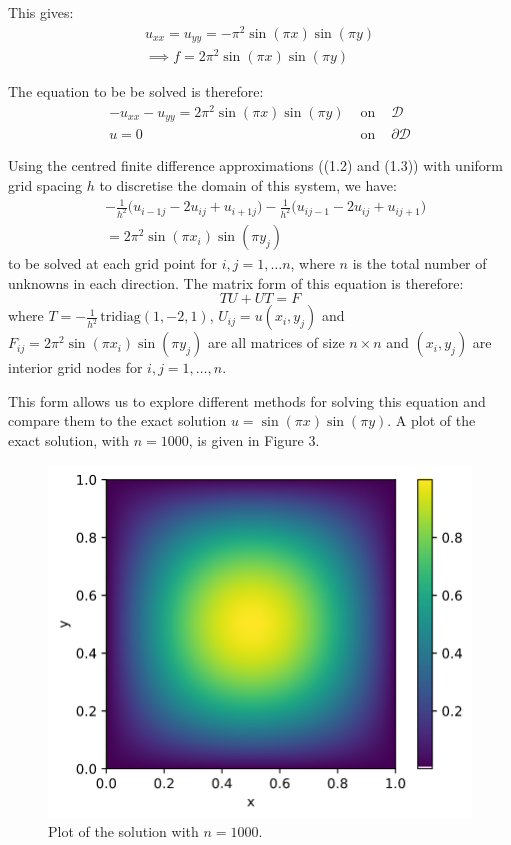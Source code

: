 \documentclass{article}
\numberwithin{equation}{section}
\begin{document}
This gives:
\begin{eqnarray} 
u_{xx} = u_{yy} = - \pi^2 \sin{(\pi x)} \sin{(\pi y)} \nonumber \\
\implies f = 2 \pi^2 \sin{(\pi x)} \sin {(\pi y)}
\end{eqnarray}

The equation to be be solved is therefore:
\begin{eqnarray}
-u_{xx} -u_{yy} = 2 \pi^2 \sin{(\pi x)} \sin {(\pi y)} & \text{ on } & \mathcal{D} \nonumber \\
u = 0 & \text{ on } & \partial \mathcal{D}
\end{eqnarray}

Using the centred finite difference approximations ((1.2) and (1.3)) with uniform grid spacing $h$ to discretise the domain of this system, we have:
	\begin{eqnarray}
	& -\frac{1}{h^2} \big( u_{i-1j} - 2u_{ij} + u_{i+1j} \big) - \frac{1}{h^2} \big( u_{ij-1} - 2u_{ij} + u_{ij+1} \big) \nonumber \\ & = 2\pi^2 \sin(\pi x_i) \sin(\pi y_j)
	\end{eqnarray}
to be solved at each grid point for $i, j = 1, \dots n$, where $n$ is the total number of unknowns in each direction. The matrix form of this equation is therefore:
\begin{equation}
	TU + UT = F
	\end{equation}
where $T=-\frac{1}{h^2} \, \text{tridiag}(1,-2,1)$, $U_{ij} = u(x_i, y_j)$ and $F_{ij} = 2 \pi^2 \sin(\pi x_i) \sin(\pi y_j)$ are all matrices of size $n \times n$ and $(x_i, y_j)$ are interior grid nodes for $i,j=1,\dots,n$.

This form allows us to explore different methods for solving this equation and compare them to the exact solution $u = \sin(\pi x) \sin(\pi y)$. A plot of the exact solution, with $n=1000$, is given in Figure 3. 

\begin{figure}[H]
\includegraphics[scale=.5]{img/solution2.png}
\centering
\caption{Plot of the solution with $n=1000$.}
\end{figure} 
\end{document}
